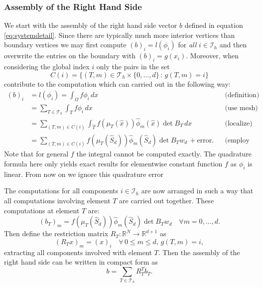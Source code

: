 \documentclass[a4paper,12pt]{article}
\begin{document}
\subsubsection*{Assembly of the Right Hand Side}

We start with the assembly of the right hand side vector $b$
defined in equation \eqref{eq:systemdetail}. Since there are typically much more 
interior vertices than boundary vertices we may first compute $(b)_i = l(\phi_i)$
for {\em all} $i\in\mathcal{I}_h$ and then overwrite the entries on the boundary
with $(b)_i = g(x_i)$. Moreover, when considering the global index $i$
only the pairs in the set
$$C(i) = \{(T,m)\in\mathcal{T}_h\times\{0,\ldots,d\} \,:\, g(T,m)=i\}$$
contribute to the computation which can carried out in the following way:
\begin{align*}
(b)_i &= l(\phi_i) = \int_\Omega f \phi_i\,dx &&\text{(definition)} \\
&= \sum_{T\in\mathcal{T}_h} \int_T f \phi_i\,dx &&\text{(use mesh)} \\
&= \sum_{(T,m)\in C(i)} \int_{\hat T} f(\mu_T(\hat x)) \hat\phi_m(\hat x) \det B_T\,dx 
&&\text{(localize)} \\
&= \sum_{(T,m)\in C(i)} 
f(\mu_T(\hat S_d)) \hat\phi_m(\hat S_d) \det B_T w_d \, + \text{error}. &&\text{(employ quadrature)} 
\end{align*}
Note that for general $f$ the integral cannot be computed exactly. The
quadrature formula here only yields exact results for elementwise constant
function $f$ as $\phi_i$ is linear. From now on we ignore this quadrature error

The computations for all components $i\in\mathcal{I}_h$ are now arranged
in such a way that all computations involving element $T$ are carried out together.
These computations at element $T$ are:
\begin{equation}
(b_T)_m =  f(\mu_T(\hat S_d)) \hat\phi_m(\hat S_d) \det B_T w_d \quad \forall m=0,\ldots,d .
\label{eq:lambda_volume}
\end{equation}
Then define the restriction matrix 
$R_T : \mathbb{R}^N \to \mathbb{R}^{d+1}$ as
\begin{equation}
(R_T x)_m = (x)_i \quad \forall \,0\leq m \leq d, \,g(T,m)=i,
\end{equation}
extracting all components involved with element $T$. Then
the assembly of the right hand side can be written in compact form as
\begin{equation}
b = \sum_{T\in\mathcal{T}_h} R_T^T b_T .
\label{eq:rhsassembly}
\end{equation}
\end{document}
